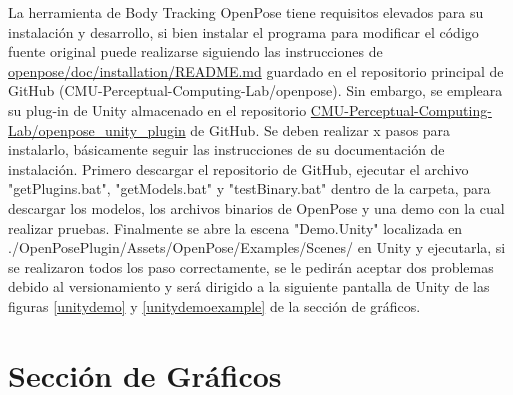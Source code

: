 La herramienta de Body Tracking OpenPose tiene requisitos elevados para su instalación y desarrollo, si bien instalar el programa para modificar el código fuente original puede realizarse siguiendo las instrucciones de  \href{https://github.com/CMU-Perceptual-Computing-Lab/openpose/blob/master/doc/installation/README.md}{openpose/doc/installation/README.md} guardado en el repositorio principal de GitHub (CMU-Perceptual-Computing-Lab/openpose). Sin embargo, se empleara su plug-in de Unity almacenado en el repositorio  \href{https://github.com/CMU-Perceptual-Computing-Lab/openpose\_unity\_plugin}{CMU-Perceptual-Computing-Lab/openpose\_unity\_plugin} de GitHub.
Se deben realizar x pasos para instalarlo, básicamente seguir las instrucciones de su documentación de instalación. Primero descargar el repositorio de GitHub, ejecutar el archivo "getPlugins.bat", "getModels.bat" y "testBinary.bat" dentro de la carpeta, para descargar los modelos, los archivos binarios de OpenPose y una demo con la cual realizar pruebas. 
Finalmente se abre la escena "Demo.Unity" localizada en ./OpenPosePlugin/Assets/OpenPose/Examples/Scenes/ en Unity y ejecutarla, si se realizaron todos los paso correctamente, se le pedirán aceptar dos problemas debido al versionamiento y será dirigido a la siguiente pantalla de Unity de las figuras \ref{unitydemo} y \ref{unitydemoexample} de la sección de gráficos.

\section{}

\section{Sección de Gráficos}

